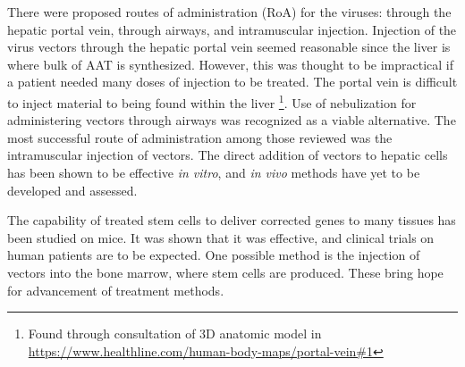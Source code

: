 There were proposed routes of administration (RoA) for the viruses: through the hepatic portal vein, through airways, and intramuscular injection.
Injection of the virus vectors through the hepatic portal vein seemed reasonable since the liver is where bulk of AAT is synthesized.
However, this was thought to be impractical if a patient needed many doses of injection to be treated.
The portal vein is difficult to inject material to being found within the liver
\footnote{Found through consultation of 3D anatomic model in \url{https://www.healthline.com/human-body-maps/portal-vein#1}}.
Use of nebulization for administering vectors through airways was recognized as a viable alternative.
The most successful route of administration among those reviewed was the intramuscular injection of vectors.
The direct addition of vectors to hepatic cells has been shown to be effective \textit{in vitro}, and \textit{in vivo} methods have yet to be developed and assessed.

The capability of treated stem cells to deliver corrected genes to many tissues has been studied on mice.
It was shown that it was effective, and clinical trials on human patients are to be expected.
One possible method is the injection of vectors into the bone marrow, where stem cells are produced.
These bring hope for advancement of treatment methods.

